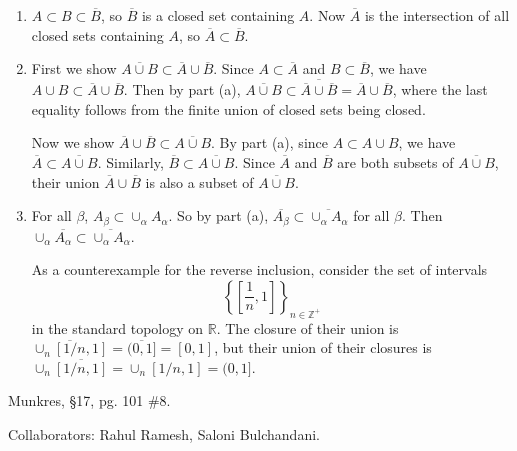 \documentclass[10pt]{report}
\begin{document}
\begin{enumerate}
	\item $A \subset B \subset \overline{B}$, so $\overline{B}$ is a closed set containing $A$. Now $\overline{A}$ is the intersection of all closed sets containing $A$, so $\overline{A} \subset \overline{B}$.
	\item First we show $\overline{A \cup B} \subset \overline{A}\cup \overline{B}$. Since $A \subset \overline{A}$ and $B\subset \overline{B}$, we have $A \cup B \subset \overline{A} \cup \overline{B}$. Then by part (a), $\overline{A \cup B} \subset \overline{\overline{A} \cup \overline{B}} = \overline{A} \cup \overline{B}$, where the last equality follows from the finite union of closed sets being closed.

		Now we show $\overline{A} \cup \overline{B} \subset \overline{A \cup B} $. By part (a), since $A \subset A \cup B$, we have $\overline{A} \subset \overline{A \cup B} $. Similarly, $\overline{B} \subset  \overline{A \cup B} $. Since $\overline{A}$ and $\overline{B}$ are both subsets of $\overline{A \cup B} $, their union $\overline{A} \cup \overline{B}$ is also a subset of $\overline{A \cup B} $.
	\item For all $\beta$, $A_{\beta}\subset \cup_{\alpha}A_{\alpha}$. So by part (a), $\overline{A_{\beta}} \subset \overline{\cup_{\alpha}A_{\alpha}} $ for all $\beta$. Then $\cup_{\alpha} \overline{A_{\alpha}} \subset \overline{\cup_{\alpha}A _{\alpha}} $.

		As a counterexample for the reverse inclusion, consider the set of intervals 
		\[
		\left\{ \left[ \frac{1}{n} , 1 \right] \right\}_{n \in \mathbb{Z}^+}
	\] in the standard topology on $\mathbb{R}$. The closure of their union is $\overline{\cup_{n}[1/n, 1]} = \overline{(0,1]} =[0,1]$, but their union of their closures is $\cup_{n}\overline{[1/n,1]} =\cup_{n}[1/n,1] = (0,1]$.
\end{enumerate}

\begin{exer}[5 points]
	Munkres, \S 17, pg. 101 \#8.
\end{exer}
{\color{blue}Collaborators: Rahul Ramesh, Saloni Bulchandani.}
\end{document}
